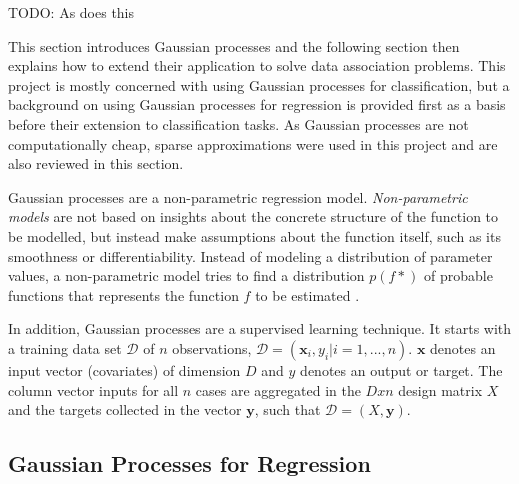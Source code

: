 \documentclass[12pt,a4paper]{report}
\theoremstyle{definition}
\begin{document}
\citep{Griffiths2023} TODO: As does this

This section introduces Gaussian processes and the following section then explains how to extend their application to solve data association problems. 
This project is mostly concerned with using Gaussian processes for classification, but a background on using Gaussian processes for regression is provided first as a basis before their extension to classification tasks. 
As Gaussian processes are not computationally cheap, sparse approximations were used in this project and are also reviewed in this section.

Gaussian processes are a non-parametric regression model. 
\emph{Non-parametric models} are not based on insights about the concrete structure of the function to be modelled, but instead make assumptions about the function itself, such as its smoothness or differentiability. 
Instead of modeling a distribution of parameter values, a non-parametric model tries to find a distribution $p(f*)$ of probable functions that represents the function $f$ to be estimated \citep{Kaiser2017}.

In addition, Gaussian processes are a supervised learning technique. 
It starts with a training data set $\mathcal{D}$ of $n$ observations, $\mathcal{D} = (\textbf{x}_{i}, y_{i} | i = 1, ..., n)$.
$\textbf{x}$ denotes an input vector (covariates) of dimension $D$ and $y$ denotes an output or target. 
The column vector inputs for all $n$ cases are aggregated in the $D x n$ design matrix $X$ and the targets collected in the vector $\textbf{y}$, such that $\mathcal{D} = (X, \textbf{y})$.

\subsection{Gaussian Processes for Regression}



%
\end{document}
